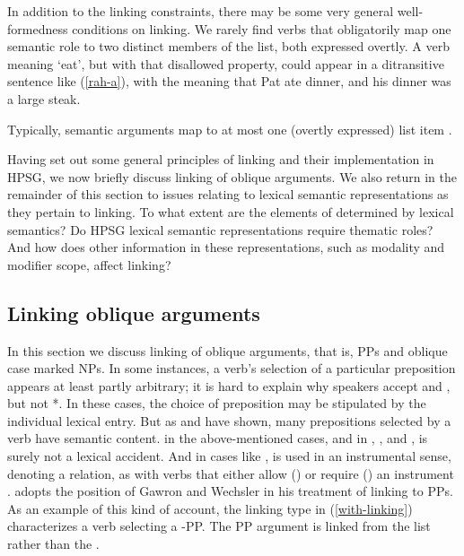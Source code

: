 \documentclass[output=paper
 	        ,biblatex
                ,babelshorthands
                ,newtxmath
                ,draftmode
                ,colorlinks, citecolor=brown
]{langscibook}
\begin{document}
In addition to the linking constraints, there may be some very general well-formedness conditions on
linking. We rarely find verbs that obligatorily map  one semantic role to two  distinct members of
the \argst list, both expressed overtly.  A verb meaning `eat', but  with that disallowed property,
could appear in a ditransitive sentence like  (\ref{rah-a}), with the meaning that Pat ate dinner,
and his dinner was a large steak.

\begin{exe}
\end{exe}

\noindent
Typically, semantic arguments map to at most one (overtly expressed) \argst list item \citep[262--268]{Davis2001}.

Having set out some general principles of linking and their implementation in HPSG, we now briefly discuss linking of oblique arguments.
We also return in the remainder of this section to issues relating to lexical semantic representations as they pertain to linking.
To what extent are the elements of \argst determined by lexical semantics?
Do HPSG lexical semantic representations require thematic roles?
And how does other information in these representations, such as modality and modifier scope, affect linking?

\subsection{Linking oblique arguments}
In this section we discuss linking of oblique arguments, that is, PPs and oblique case marked NPs.
In some instances, a verb's selection of a particular preposition appears at least partly arbitrary;
it is hard to explain why  speakers accept  and , but  not *.
In these cases, the choice of preposition may be stipulated by the individual lexical entry.
But as \citet{Gawron1986} and \citet{Wechsler1995} have shown, many prepositions selected by a verb have semantic content.
 in the above-mentioned cases, and in , , and , is surely not a lexical accident.
And in  cases like ,  is used in an instrumental sense, denoting a  relation, as with verbs that either allow () or require () an instrument \citep{KoenigandDavis2006}.
\citet{Davis1996,Davis2001} adopts the position of Gawron and Wechsler in his treatment of linking to PPs.
As an example of this kind of account, the linking type in (\ref{with-linking}) characterizes a verb selecting a -PP. 
The PP argument is linked from the \rels list rather than the .
\end{document}
